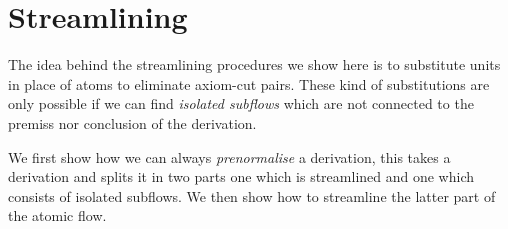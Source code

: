 \documentclass[a4paper]{amsart}
\newtheorem{lem}[thm]{Lemma}
\newtheorem{pro}[thm]{Proposition}
\theoremstyle{remark}
\theoremstyle{definition}
\begin{document}




\section{Streamlining}

The idea behind the streamlining procedures we show here is to substitute units in place of atoms to eliminate axiom-cut pairs. These kind of substitutions are only possible if we can find \emph{isolated subflows} which are not connected to the premiss nor conclusion of the derivation.

We first show how we can always \emph{prenormalise} a derivation, this takes a derivation and splits it in two parts one which is streamlined and one which consists of isolated subflows. We then show how to streamline the latter part of the atomic flow.
\end{document}
